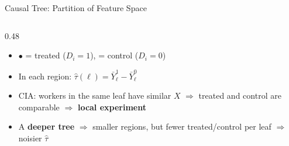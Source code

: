 \documentclass[dvipsnames,hyperref={pdfpagelabels=false}]{beamer}
\begin{document}
\begin{frame}{Causal Tree: Partition of Feature Space}
\begin{columns}[T]
\begin{column}{0.48\textwidth}
\begin{itemize}
		\vspace{0.25cm}
		\item {\color{orange!85!black}$\bullet$} = treated ($D_i=1$),\quad {\color{blue!75}$\times$} = control ($D_i=0$)
		\vspace{0.25cm}
		\item In each region: $\hat{\tau}(\ell) = \bar{Y}^1_\ell - \bar{Y}^0_\ell$
		\vspace{0.25cm}
		\item CIA: workers in the same leaf have similar $X$ $\Rightarrow$ treated and control are comparable $\Rightarrow$ \textbf{local experiment}
		\vspace{0.25cm}
		\item A \textbf{deeper tree} $\Rightarrow$ smaller regions, but fewer treated/control per leaf $\Rightarrow$ noisier $\hat{\tau}$
	\end{itemize}
	\end{column}
\end{columns}
\end{frame}
\end{document}
